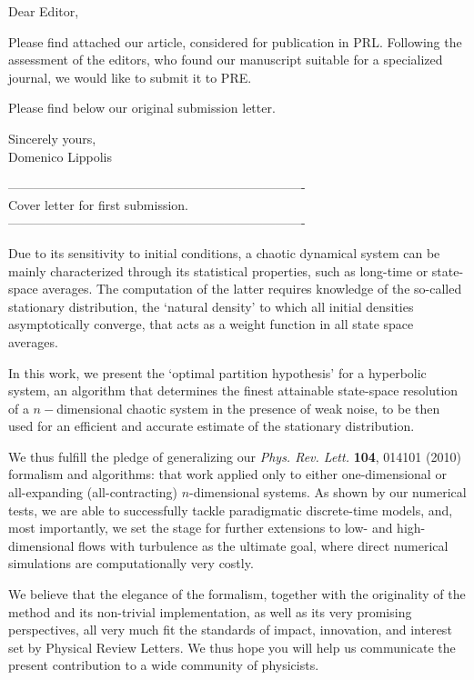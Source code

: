 \documentclass[12pt]{letter}
\begin{document}

Dear Editor,

Please find attached our article, 
considered for publication in PRL.  
Following the assessment of the editors, who found our manuscript
suitable for a specialized journal,  
we would like to submit it to PRE.

Please find below our original submission letter.

Sincerely yours,\\
\phantom{~~~~~~~~~~~~~~~}Domenico Lippolis 


----------------------------------------------------------------------\\
Cover letter for first submission.\\
----------------------------------------------------------------------

Due to its sensitivity to initial conditions, a chaotic dynamical system
can be mainly characterized through its statistical properties, such as
long-time or state-space averages. The computation of the latter requires
knowledge of the so-called stationary distribution, the `natural density'
to which all initial densities asymptotically converge, that acts as a
weight function in all state space averages.

In this work, we present the `optimal partition hypothesis' for a
hyperbolic system, an algorithm that determines the finest attainable
state-space resolution of a $n-$dimensional chaotic system in the
presence of weak noise, to be then used for an efficient and accurate
estimate of the stationary distribution.

We thus fulfill the pledge of generalizing our {\em Phys. Rev. Lett.}
\textbf{104}, 014101 (2010) formalism and algorithms: that work applied only
to either one-dimensional or all-expanding (all-contracting)
$n$-dimensional systems. As shown by our numerical tests, we are able to
successfully tackle paradigmatic discrete-time models, and, most
importantly, we set the stage for further extensions to low- and
high-dimensional flows with turbulence as the ultimate goal, where direct
numerical simulations are computationally very costly.

We believe that the elegance of the formalism, together with the
originality of the method and its non-trivial implementation, as well as
its very promising perspectives, all very much fit the standards of
impact, innovation, and interest set by Physical Review Letters. We thus
hope you will help us communicate the present contribution to a wide
community of physicists.
\end{document}
